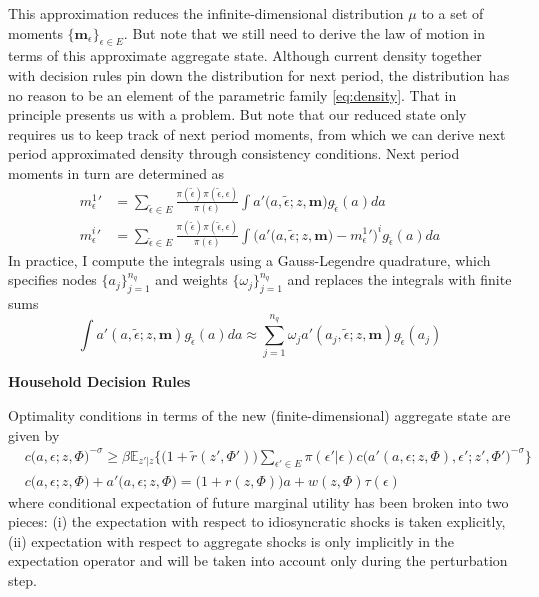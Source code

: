 \documentclass[a4paper,11pt]{article}  %
\begin{document}
This approximation reduces the infinite-dimensional distribution $\mu$ to a set of moments
$ \big\{\mathbf{m}_{\epsilon}\big\}_{\epsilon \in E} $. But note that we still need to derive the law of motion
in terms of this approximate aggregate state. Although current density together with decision rules pin down the
distribution for next period, the distribution has no reason to be an element of the parametric family
\eqref{eq:density}.
That in principle presents us with a problem. But note that our reduced state only requires us to keep track of
next period moments, from which we can derive next period approximated density through consistency conditions.
Next period moments in turn are determined as
%
\begin{align*}
   {m_{\epsilon}^1}' & = \sum_{ \tilde{\epsilon} \in E }
   \frac{ \pi ( \tilde{\epsilon} ) \pi( \tilde{\epsilon}, \epsilon ) }{ \pi( \epsilon ) }
   \int a'\Big( a, \tilde{\epsilon}; z, \mathbf{m} \Big) g_{ \tilde{\epsilon} }(a) da \\
   {m_{\epsilon}^i}' & =   \sum_{ \tilde{\epsilon} \in E }
   \frac{ \pi ( \tilde{\epsilon} ) \pi( \tilde{\epsilon}, \epsilon ) }{ \pi( \epsilon ) }
   \int \Big( a'\Big( a, \tilde{\epsilon}; z, \mathbf{m} \Big)  - {m_{\epsilon}^1}' \Big)^i g_{ \tilde{\epsilon} }(a) da
\end{align*}
%
In practice, I compute the integrals using a Gauss-Legendre quadrature, which specifies nodes
$\big\{ a_j \big\}_{j=1}^{n_q}$ and weights $\big\{ \omega_j \big\}_{j=1}^{n_q}$ and replaces the integrals
with finite sums
\begin{equation*}
   \label{eq:aaa}
   \int a'( a, \tilde{\epsilon}; z, \mathbf{m} ) g_{ \tilde{\epsilon} }(a) da \approx
   \sum_{j=1}^{n_q} \omega_j a'( a_j, \tilde{\epsilon}; z, \mathbf{m} ) g_{ \tilde{\epsilon} }(a_j)
\end{equation*}

\textbf{Household Decision Rules}

Optimality conditions in terms of the new (finite-dimensional) aggregate state are given by
\begin{align*}
     & c \Big( a, \epsilon; z, \Phi \Big)^{ - \sigma } \ge \beta \mathbb{E}_{z'|z}
   \Bigg\{
   \big( 1+\tilde{r}( z', \Phi')  \big)
   \sum_{ \epsilon' \in E } \pi( \epsilon'| \epsilon )  c \Big( a'( a, \epsilon; z, \Phi ), \epsilon'; z', \Phi' \Big)^{- \sigma}
   \Bigg\} \\
     & c\big( a, \epsilon; z, \Phi \big) + a'\big( a, \epsilon; z, \Phi \big) =
   \big( 1 + r( z, \Phi ) \big) a + w ( z,\Phi ) \tau( \epsilon )
\end{align*}
where conditional expectation of future marginal utility has been broken into two pieces: (i) the expectation
with respect to idiosyncratic shocks is taken explicitly, (ii) expectation with respect to aggregate shocks is only
implicitly in the expectation operator and will be taken into account only during the perturbation step.
\end{document}
